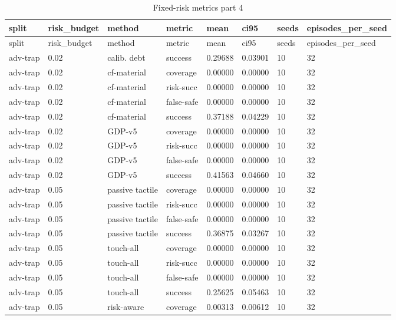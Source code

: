 \documentclass{article}
\begin{document}
\begin{center}
\tiny
\renewcommand{\arraystretch}{0.92}
\setlength{\tabcolsep}{3pt}
\begin{longtable}{llllllll}
\caption{Fixed-risk metrics part 4}\label{tab:fixed-risk-metrics-4}\\
\toprule
split & risk\_budget & method & metric & mean & ci95 & seeds & episodes\_per\_seed \\
\midrule
\endfirsthead
\toprule
split & risk\_budget & method & metric & mean & ci95 & seeds & episodes\_per\_seed \\
\midrule
\endhead
adv-trap & 0.02 & calib. debt & success & 0.29688 & 0.03901 & 10 & 32 \\
adv-trap & 0.02 & cf-material & coverage & 0.00000 & 0.00000 & 10 & 32 \\
adv-trap & 0.02 & cf-material & risk-succ & 0.00000 & 0.00000 & 10 & 32 \\
adv-trap & 0.02 & cf-material & false-safe & 0.00000 & 0.00000 & 10 & 32 \\
adv-trap & 0.02 & cf-material & success & 0.37188 & 0.04229 & 10 & 32 \\
adv-trap & 0.02 & GDP-v5 & coverage & 0.00000 & 0.00000 & 10 & 32 \\
adv-trap & 0.02 & GDP-v5 & risk-succ & 0.00000 & 0.00000 & 10 & 32 \\
adv-trap & 0.02 & GDP-v5 & false-safe & 0.00000 & 0.00000 & 10 & 32 \\
adv-trap & 0.02 & GDP-v5 & success & 0.41563 & 0.04660 & 10 & 32 \\
adv-trap & 0.05 & passive tactile & coverage & 0.00000 & 0.00000 & 10 & 32 \\
adv-trap & 0.05 & passive tactile & risk-succ & 0.00000 & 0.00000 & 10 & 32 \\
adv-trap & 0.05 & passive tactile & false-safe & 0.00000 & 0.00000 & 10 & 32 \\
adv-trap & 0.05 & passive tactile & success & 0.36875 & 0.03267 & 10 & 32 \\
adv-trap & 0.05 & touch-all & coverage & 0.00000 & 0.00000 & 10 & 32 \\
adv-trap & 0.05 & touch-all & risk-succ & 0.00000 & 0.00000 & 10 & 32 \\
adv-trap & 0.05 & touch-all & false-safe & 0.00000 & 0.00000 & 10 & 32 \\
adv-trap & 0.05 & touch-all & success & 0.25625 & 0.05463 & 10 & 32 \\
adv-trap & 0.05 & risk-aware & coverage & 0.00313 & 0.00612 & 10 & 32 \\

\end{longtable}
\end{center}
\end{document}
